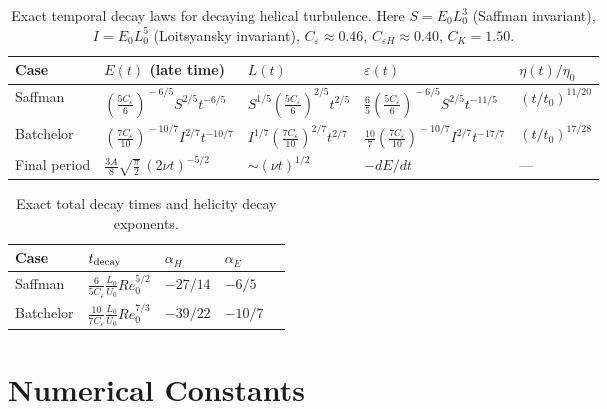 \documentclass[12pt,a4paper]{article}
\newcommand{\eps}{\varepsilon}
\newcommand{\Reu}{Re_{0}}
\newcommand{\CK}{C_{K}}
\newcommand{\Ceps}{C_{\varepsilon}}
\newcommand{\CepsH}{C_{\varepsilon H}}
\newcommand{\alphaH}{\alpha_{H}}
\newcommand{\alphaE}{\alpha_{E}}
\theoremstyle{plain}
\theoremstyle{definition}
\begin{document}
\begin{table}[ht]
\centering
\caption{Exact temporal decay laws for decaying helical turbulence.
  Here $S = E_0 L_0^3$ (Saffman invariant),
  $I = E_0 L_0^5$ (Loitsyansky invariant),
  $\Ceps \approx 0.46$,
  $\CepsH \approx 0.40$,
  $\CK = 1.50$.}
\label{tab:summary}
\renewcommand{\arraystretch}{1.5}
\begin{tabular}{@{}lllll@{}}
  \toprule
  Case & $E(t)$ (late time) & $L(t)$ & $\eps(t)$ & $\eta(t)/\eta_0$\\
  \midrule
  Saffman
    & $\!\left(\!\tfrac{5\Ceps}{6}\!\right)^{\!\!-6/5}\!\!S^{2/5}t^{-6/5}$
    & $S^{1/5}\!\left(\!\tfrac{5\Ceps}{6}\!\right)^{\!\!2/5}\!t^{2/5}$
    & $\tfrac{6}{5}\!\left(\!\tfrac{5\Ceps}{6}\!\right)^{\!\!-6/5}\!\!S^{2/5}t^{-11/5}$
    & $(t/t_0)^{11/20}$\\[4pt]
  Batchelor
    & $\!\left(\!\tfrac{7\Ceps}{10}\!\right)^{\!\!-10/7}\!\!I^{2/7}t^{-10/7}$
    & $I^{1/7}\!\left(\!\tfrac{7\Ceps}{10}\!\right)^{\!\!2/7}\!t^{2/7}$
    & $\tfrac{10}{7}\!\left(\!\tfrac{7\Ceps}{10}\!\right)^{\!\!-10/7}\!\!I^{2/7}t^{-17/7}$
    & $(t/t_0)^{17/28}$\\[4pt]
  Final period
    & $\tfrac{3A}{8}\sqrt{\tfrac{\pi}{2}}\,(2\nu t)^{-5/2}$
    & $\sim(\nu t)^{1/2}$
    & $-dE/dt$
    & ---\\
  \bottomrule
\end{tabular}
\end{table}

\begin{table}[ht]
\centering
\caption{Exact total decay times and helicity decay exponents.}
\label{tab:decay_times}
\renewcommand{\arraystretch}{1.5}
\begin{tabular}{@{}lllll@{}}
  \toprule
  Case & $t_{\rm decay}$ & $\alphaH$ & $\alphaE$\\
  \midrule
  Saffman
    & $\tfrac{6}{5\Ceps}\tfrac{L_0}{U_0}\Reu^{5/2}$
    & $-27/14$
    & $-6/5$\\[4pt]
  Batchelor
    & $\tfrac{10}{7\Ceps}\tfrac{L_0}{U_0}\Reu^{7/3}$
    & $-39/22$
    & $-10/7$\\
  \bottomrule
\end{tabular}
\end{table}

\section{Numerical Constants}
\label{sec:constants}
\end{document}
